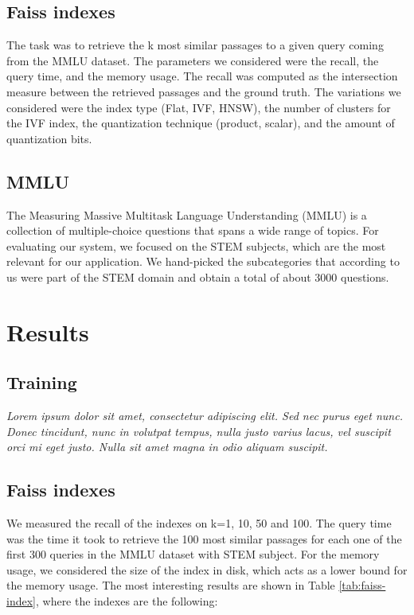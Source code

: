 \documentclass[11pt]{article}
\begin{document}
\subsection{Faiss indexes}

The task was to retrieve the k most similar passages to a
given query coming from the MMLU dataset.
The parameters we considered were the recall, the query time, 
and the memory usage. 
The recall was computed as the intersection measure between the retrieved 
passages and the ground truth. 
The variations we considered were the index type (Flat, IVF, HNSW), the number 
of clusters for the IVF index, the quantization technique (product, scalar), and
the amount of quantization bits.

\subsection{MMLU}

The Measuring Massive Multitask Language Understanding (MMLU) is a collection of 
multiple-choice questions that spans a wide range of topics.
For evaluating our system, we focused on the STEM subjects, which are the most
relevant for our application.
We hand-picked the subcategories that according to us were part of the STEM domain and
obtain a total of about 3000 questions.

\section{Results}

\subsection{Training}

\textit{Lorem ipsum dolor sit amet, consectetur adipiscing elit. Sed nec purus eget
nunc. Donec tincidunt, nunc in volutpat tempus, nulla justo varius lacus, vel
suscipit orci mi eget justo. Nulla sit amet magna in odio aliquam suscipit.}

\subsection{Faiss indexes}

We measured the recall of the indexes on k=1, 10, 50 and 100. The query time was 
the time it took to retrieve the 100 most similar passages for each one of the first 300
queries in the MMLU dataset with STEM subject. 
For the memory usage, we considered the size of the index in disk, which acts as a lower
bound for the memory usage.
The most interesting results are shown in Table \ref{tab:faiss-index}, where the indexes 
are the following:
\end{document}

